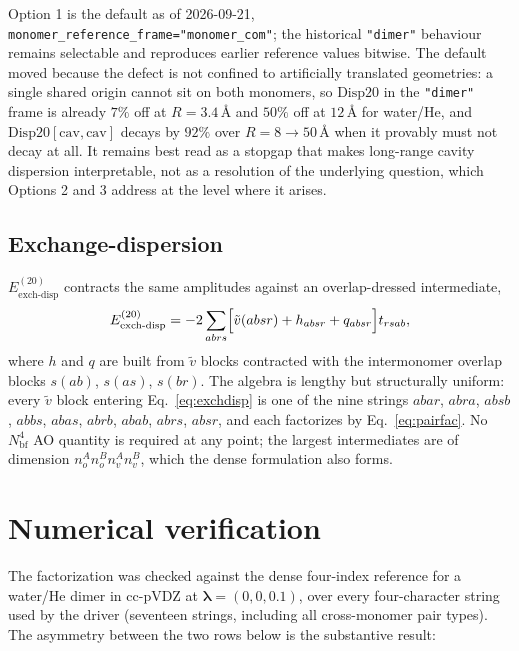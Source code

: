 \documentclass[11pt]{article}
\newcommand{\lam}{\bm{\lambda}}
\newcommand{\nbf}{N_{\mathrm{bf}}}
\begin{document}
\noindent
Option 1 is the default as of 2026-09-21,
\texttt{monomer\_reference\_frame="monomer\_com"}; the historical
\texttt{"dimer"} behaviour remains selectable and reproduces earlier reference
values bitwise. The default moved because the defect is not confined to
artificially translated geometries: a single shared origin cannot sit on both
monomers, so $\mathrm{Disp20}$ in the \texttt{"dimer"} frame is already
$7\%$ off at $R = 3.4$\,\AA{} and $50\%$ off at $12$\,\AA{} for water/He,
and $\mathrm{Disp20[cav,cav]}$ decays by $92\%$ over $R = 8 \to 50$\,\AA{}
when it provably must not decay at all. It remains best read as a stopgap that
makes long-range cavity dispersion interpretable, not as a resolution of the
underlying question, which Options 2 and 3 address at the level where it
arises.

\subsection{Exchange-dispersion}

$E^{(20)}_{\mathrm{exch\text{-}disp}}$ contracts the same amplitudes against an
overlap-dressed intermediate,
\begin{equation}
E^{(20)}_{\mathrm{exch\text{-}disp}}
= -2 \sum_{abrs}\Bigl[\tilde v(absr) + h_{absr} + q_{absr}\Bigr] t_{rsab},
\label{eq:exchdisp}
\end{equation}
where $h$ and $q$ are built from $\tilde v$ blocks contracted with the
intermonomer overlap blocks $s(ab)$, $s(as)$, $s(br)$. The algebra is lengthy
but structurally uniform: every $\tilde v$ block entering
Eq.~\eqref{eq:exchdisp} is one of the nine strings
$abar$, $abra$, $absb$, $abbs$, $abas$, $abrb$, $abab$, $abrs$, $absr$, and
each factorizes by Eq.~\eqref{eq:pairfac}. No $\nbf^4$ AO quantity is required
at any point; the largest intermediates are of dimension
$n_o^A n_o^B n_v^A n_v^B$, which the dense formulation also forms.

\section{Numerical verification}
\label{sec:numerics}

The factorization was checked against the dense four-index reference for a
water/He dimer in cc-pVDZ at $\lam = (0,0,0.1)$, over every four-character
string used by the driver (seventeen strings, including all cross-monomer pair
types). The asymmetry between the two rows below is the substantive result:
\end{document}
